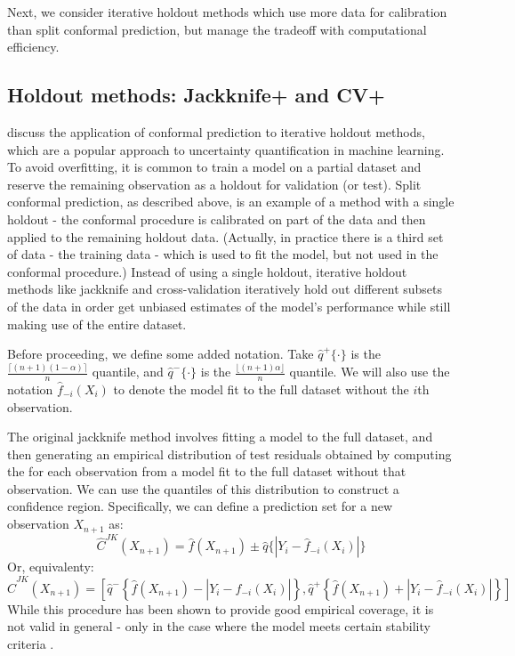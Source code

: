 \documentclass[a4paper, 12pt]{article}
\begin{document}
Next, we consider iterative holdout methods which use more data for calibration than split conformal prediction, but manage the tradeoff with computational efficiency.

\subsection{Holdout methods: Jackknife+ and CV+}
\label{sec:jackknife}
\textcite{barberPredictiveInferenceJackknife2020} discuss the application of conformal prediction to iterative holdout methods, which are a popular approach to uncertainty quantification in machine learning. To avoid overfitting, it is common to train a model on a partial dataset and reserve the remaining observation as a holdout for validation (or test). Split conformal prediction, as described above, is an example of a method with a single holdout - the conformal procedure is calibrated on part of the data and then applied to the remaining holdout data. (Actually, in practice there is a third set of data - the training data - which is used to fit the model, but not used in the conformal procedure.) Instead of using a single holdout, iterative holdout methods like jackknife and cross-validation iteratively hold out different subsets of the data in order get unbiased estimates of the model's performance while still making use of the entire dataset.

Before proceeding, we define some added notation. Take $\hat{q}^+\{\cdot \}$ is the $\frac{\lceil (n+1)(1-\alpha) \rceil }{n}$ quantile, and $\hat{q}^-\{\cdot \}$ is the $\frac{\lfloor (n+1)\alpha \rfloor }{n}$ quantile. We will also use the notation $\hat{f}_{-i}(X_i)$ to denote the model fit to the full dataset without the $i$th observation.

The original jackknife method involves fitting a model to the full dataset, and then generating an empirical distribution of test residuals obtained by computing the for each observation from a model fit to the full dataset without that observation. We can use the quantiles of this distribution to construct a confidence region. Specifically, we can define a prediction set for a new observation $X_{n+1}$ as:
\[ \hat{C}^{JK}(X_{n+1}) = \hat{f}(X_{n+1}) \pm \hat{q}\{ |Y_i - \hat{f}_{-i}(X_i)|\} \]
Or, equivalenty:
\[ \hat{C}^{JK}(X_{n+1}) = \left[ \hat{q}^{-}\left\{ \hat{f}(X_{n+1}) - |Y_i - \hat{f}_{-i}(X_i)|\right\}, \hat{q}^{+}\left\{ \hat{f}(X_{n+1}) + |Y_i - \hat{f}_{-i}(X_i)|\right\} \right] \]
While this procedure has been shown to provide good empirical coverage, it is not valid in general - only in the case where the model meets certain stability criteria \autocite{steinbergerConditionalPredictiveInference2022}.
\end{document}
